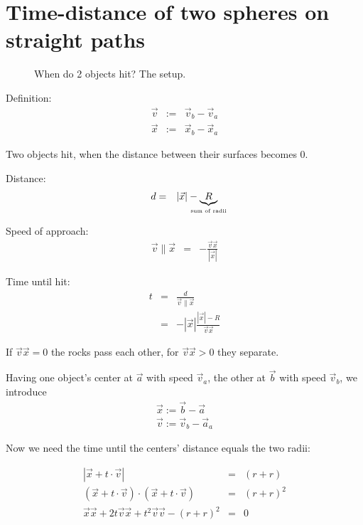 \section{Time-distance of two spheres on straight paths}

\begin{figure}[ht]
\begin{center}

\end{center}
\caption{When do 2 objects hit? The setup.}
\end{figure}

\iffalse

Definition:
\begin{eqnarray}
\vec{v} &:=& \vec{v}_b - \vec{v}_a \\
\vec{x} &:=& \vec{x}_b - \vec{x}_a
\end{eqnarray}

Two objects hit, when the distance between their surfaces becomes 0.

Distance:
\begin{eqnarray}
d &=& |\vec{x}| - \underbrace{R}_{\makebox[0mm]{\tiny sum of radii}}
\end{eqnarray}

Speed of approach:
\begin{eqnarray}
\vec{v} \parallel \vec{x} &=& - \frac{ \vec{v}\vec{x} }{ |\vec{x}| }
\end{eqnarray}

Time until hit:
\begin{eqnarray}
t &=& \frac{ d }{ \vec{v} \parallel \vec{x} } \\
  &=& - |\vec{x}| \frac{ |\vec{x}| - R }{ \vec{v}\vec{x} }
\end{eqnarray}

If $\vec{v}\vec{x} = 0$ the rocks pass each other, for
$\vec{v}\vec{x} > 0$ they separate.

\else

Having one object's center at $\vec{a}$ with speed $\vec{v}_a$, the other at
$\vec{b}$ with speed $\vec{v}_b$, we introduce
%
\begin{eqnarray}
\vec{x} := \vec{b}   - \vec{a}   \\
\vec{v} := \vec{v}_b - \vec{a}_a 
\end{eqnarray}

Now we need the time until the centers' distance equals the two radii:

\begin{eqnarray}
|\vec{x} + t \cdot \vec{v} | &=& (r+r) \\
(\vec{x} + t \cdot \vec{v} ) \cdot (\vec{x} + t \cdot \vec{v} ) &=& (r+r)^2 \\
\vec{x}\vec{x} + 2 t \vec{v}\vec{x} + t^2 \vec{v}\vec{v} - (r+r)^2 &=& 0 
\end{eqnarray}

